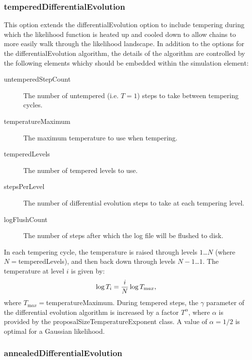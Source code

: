 \subsubsection{{\normalfont \ttfamily temperedDifferentialEvolution}}

This option extends the {\normalfont \ttfamily differentialEvolution} option to include tempering during which the likelihood function is heated up and cooled down to allow chains to more easily walk through the likelihood landscape. In addition to the options for the {\normalfont \ttfamily differentialEvolution} algorithm, the details of the algorithm are controlled by the following elements whichy should be embedded within the {\normalfont \ttfamily simulation} element:
\begin{description}
\item[{\normalfont \ttfamily untemperedStepCount}] The number of untempered (i.e. $T=1$) steps to take between tempering cycles.
\item[{\normalfont \ttfamily temperatureMaximum}] The maximum temperature to use when tempering.
\item[{\normalfont \ttfamily temperedLevels}] The number of tempered levels to use.
\item[{\normalfont \ttfamily stepsPerLevel}] The number of differential evolution steps to take at each tempering level.
\item[{\normalfont \ttfamily logFlushCount}] The number of steps after which the log file will be flushed to disk.
\end{description}

In each tempering cycle, the temperature is raised through levels $1$\ldots$N$ (where $N=${\normalfont \ttfamily temperedLevels}), and then back down through levels $N-1$\ldots$1$. The temperature at level $i$ is given by:
\begin{equation}
\log T_i = {i \over N} \log T_{\mathrm max},
\end{equation}
where $T_{\mathrm max}=${\normalfont \ttfamily temperatureMaximum}. During tempered steps, the $\gamma$ parameter of the differential evolution algorithm is increased by a factor $T^\alpha$, where $\alpha$ is provided by the {\normalfont \ttfamily proposalSizeTemperatureExponent} class. A value of $\alpha=1/2$ is optimal for a Gaussian likelihood.

\subsubsection{{\normalfont \ttfamily annealedDifferentialEvolution}}

